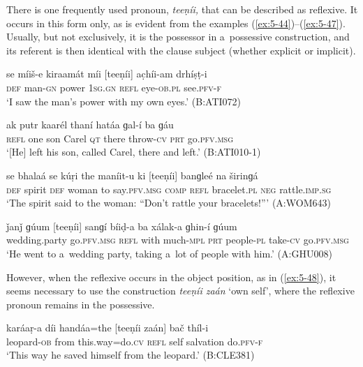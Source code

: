 There is one frequently used pronoun, \textit{teeṇíi,} that can be described as reflexive. It
occurs in this form only, as is evident from the examples (\ref{ex:5-44})--(\ref{ex:5-47}). Usually, but not
exclusively, it is the possessor in a~possessive construction, and its referent is then identical
with the clause subject (whether explicit or implicit).

\begin{exe}
\ex
\label{ex:5-44}
\gll se míiš-e kiraamát míi [teeṇíi] ac̣híi-am drhíṣṭ-i\\
\textsc{def} man-\textsc{gn} power \textsc{1sg.gn} \textsc{refl} eye-\textsc{ob.pl} see.\textsc{pfv-f}\\
\glt `I saw the man's power with my own eyes.' (B:ATI072)

\ex
\label{ex:5-45}
\gll [teeṇíi] ak putr kaarél thaní hatáa ɡal-í ba ɡáu \\
\textsc{refl} one son Carel \textsc{qt} there throw-\textsc{cv} \textsc{prt} go.\textsc{pfv.msg}\\
\glt `[He] left his son, called Carel, there and left.' (B:ATI010-1)

\ex
\label{ex:5-46}
\gll se bhalaá se kúṛi the maníit-u ki [teeṇíi] banɡleé na širinɡá\\
\textsc{def} spirit \textsc{def} woman to say.\textsc{pfv.msg} \textsc{comp} \textsc{refl} bracelet.\textsc{pl} \textsc{neg} rattle.\textsc{imp.sg}\\
\glt `The spirit said to the woman: ``Don't rattle your bracelets!''' (A:WOM643)

\ex
\label{ex:5-47}
\gll ǰanǰ ɡúum [teeṇíi] sanɡí bíiḍ-a ba xálak-a ɡhin-í ɡúum\\
wedding.party go.\textsc{pfv.msg } \textsc{refl} with much-\textsc{mpl} \textsc{prt} people-\textsc{pl} take-\textsc{cv} go.\textsc{pfv.msg}\\
\glt `He went to a~wedding party, taking a~lot of people with him.' (A:GHU008)
\end{exe}
However, when the reflexive occurs in the object position, as in (\ref{ex:5-48}), it seems necessary to use the construction \textit{teeṇíi zaán} `own self', where the reflexive pronoun remains in the possessive.
\begin{exe}
\ex
\label{ex:5-48}
\gll karáaṛ-a díi handáa=the [teeṇíi zaán] bač thíl-i\\
leopard-\textsc{ob} from this.way=do.\textsc{cv} \textsc{refl} self salvation do.\textsc{pfv-f}\\
\glt `This way he saved himself from the leopard.' (B:CLE381)
\end{exe}

